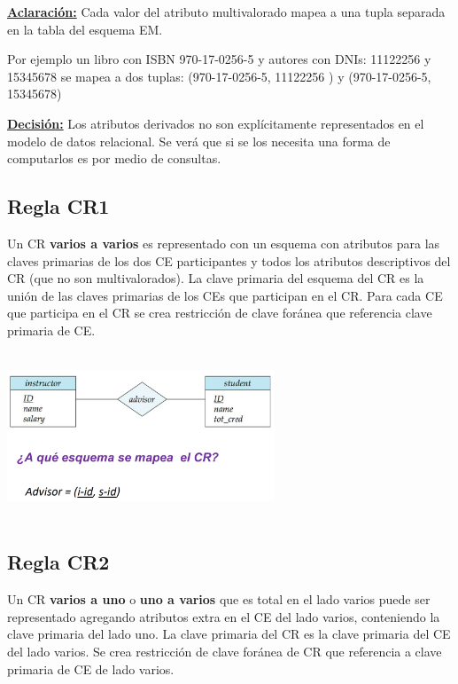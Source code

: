 \documentclass[12pt,a4paper]{report}
\begin{document}
		\underline{\textbf{Aclaración:}} Cada valor del atributo multivalorado mapea a una tupla separada en la tabla del esquema EM.
		\par Por ejemplo un libro con ISBN 970-17-0256-5 y autores con DNIs: 11122256 y 15345678 se mapea a dos tuplas: (970-17-0256-5, 11122256 ) y (970-17-0256-5, 15345678)

		\vspace{7mm}
		\underline{\textbf{Decisión:}} Los atributos derivados no son explícitamente representados en el modelo de datos relacional. Se verá que si se los necesita una forma de computarlos es por medio de consultas.
		
		\subsection{Regla CR1}
			\par Un CR \textbf{varios a varios} es representado con un esquema con atributos para las claves primarias de los dos CE participantes y todos los atributos descriptivos del CR (que no son multivalorados). La clave primaria del esquema del CR es la unión de las claves primarias de los CEs que participan en el CR. Para cada CE que participa en el CR se crea restricción de clave foránea que referencia clave primaria de CE.

			\begin{center}
				\includegraphics[width=8cm, height=5cm]{./imagenes/cr1.png}
			\end{center}

		\subsection{Regla CR2}
			\par Un CR \textbf{varios a uno} o \textbf{uno a varios} que es total en el lado varios puede ser representado agregando atributos extra en el CE del lado varios, conteniendo la clave primaria del lado uno. La clave primaria del CR es la clave primaria del CE del lado varios. Se crea restricción de clave foránea de CR que referencia a clave primaria de CE de lado varios.
\end{document}
